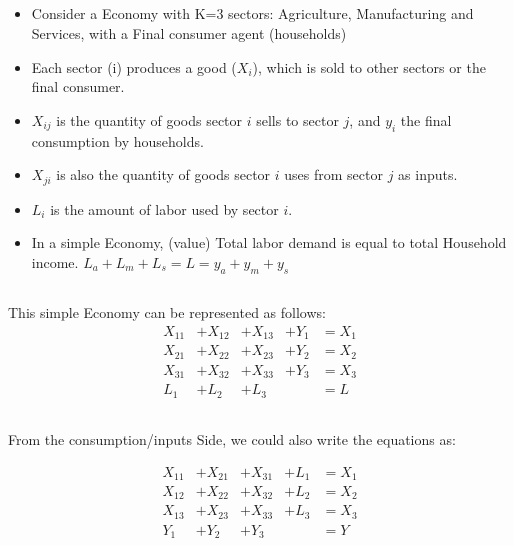 \documentclass[
  letterpaper,
  DIV=11,
  numbers=noendperiod]{scrartcl}
\begin{document}
\subsection{}\label{section}

\begin{itemize}
\item
  Consider a Economy with K=3 sectors: Agriculture, Manufacturing and
  Services, with a Final consumer agent (households)
\item
  Each sector (i) produces a good (\(X_i\)), which is sold to other
  sectors or the final consumer.
\item
  \(X_{ij}\) is the quantity of goods sector \(i\) sells to sector
  \(j\), and \(y_i\) the final consumption by households.
\item
  \(X_{ji}\) is also the quantity of goods sector \(i\) uses from sector
  \(j\) as inputs.
\item
  \(L_i\) is the amount of labor used by sector \(i\).
\item
  In a simple Economy, (value) Total labor demand is equal to total
  Household income. \(L_a + L_m + L_s = L = y_a + y_m + y_s\)
\end{itemize}

\subsection{}\label{section-1}

This simple Economy can be represented as follows: \[
\begin{aligned}
X_{11} &+ X_{12} &+ X_{13} &+ Y_{1}  &= X_{1} \\
X_{21} &+ X_{22} &+ X_{23} &+ Y_{2} &= X_{2} \\
X_{31} &+ X_{32} &+ X_{33} &+ Y_{3} &= X_{3} \\
L_1 &+ L_2 &+ L_3 &\ \ &= L 
\end{aligned}
\]

\subsection{}\label{section-2}

From the consumption/inputs Side, we could also write the equations as:

\[
\begin{aligned}
X_{11} &+ X_{21} &+ X_{31} &+ L_{1}  &= X_{1} \\
X_{12} &+ X_{22} &+ X_{32} &+ L_{2} &= X_{2} \\
X_{13} &+ X_{23} &+ X_{33} &+ L_{3} &= X_{3} \\
Y_1 &+ Y_2 &+ Y_3 &  &= Y 
\end{aligned}
\]
\end{document}
